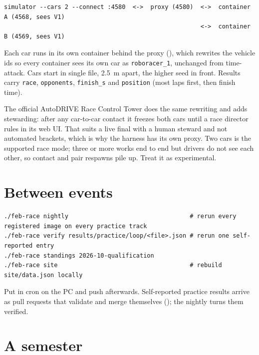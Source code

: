 \documentclass[11pt,a4paper]{article}
\begin{document}
\begin{lstlisting}
simulator --cars 2 --connect :4580  <->  proxy (4580)  <->  container A (4568, sees V1)
                                                       <->  container B (4569, sees V1)
\end{lstlisting}

Each car runs in its own container behind the proxy (), which rewrites
the vehicle ids so every container sees its own car as \texttt{roboracer\_1}, unchanged from
time-attack. Cars start in single file, 2.5~m apart, the higher seed in front. Results carry
\texttt{race}, \texttt{opponents}, \texttt{finish\_s} and \texttt{position} (most laps first,
then finish time).

The official AutoDRIVE Race Control Tower does the same rewriting and adds stewarding: after
any car-to-car contact it freezes both cars until a race director rules in its web UI. That
suits a live final with a human steward and not automated brackets, which is why the harness
has its own proxy. Two cars is the supported race mode; three or more works end to end but
drivers do not see each other, so contact and pair respawns pile up. Treat it as experimental.

\section{Between events}

\begin{lstlisting}
./feb-race nightly                                  # rerun every registered image on every practice track
./feb-race verify results/practice/loop/<file>.json # rerun one self-reported entry
./feb-race standings 2026-10-qualification
./feb-race site                                     # rebuild site/data.json locally
\end{lstlisting}

Put  in cron on the PC and push  afterwards. Self-reported practice
results arrive as pull requests that validate and merge themselves
(); the nightly turns them verified.

\section{A semester}
\end{document}

